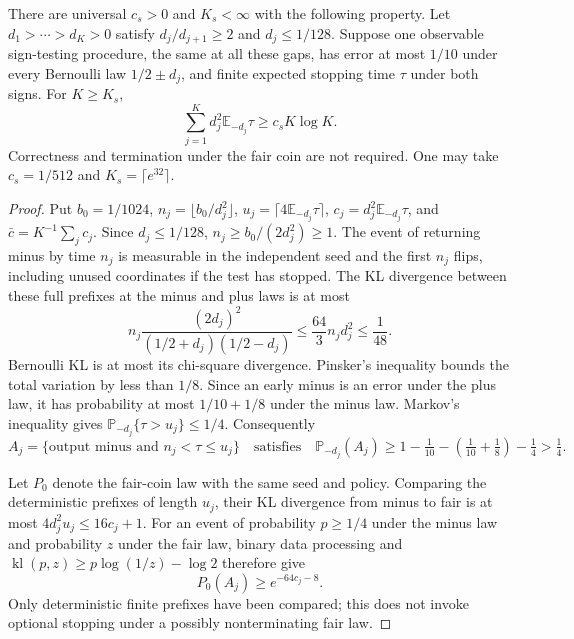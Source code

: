 \begin{lemma}\label{crit:lem:finite-sign-entropy}
There are universal $c_s>0$ and $K_s<\infty$ with the following property.
Let $d_1>\cdots>d_K>0$ satisfy $d_j/d_{j+1}\ge2$ and
$d_j\le1/128$. Suppose one observable sign-testing procedure, the same
at all these gaps, has error at most $1/10$ under every Bernoulli law
$1/2\pm d_j$, and finite expected stopping time $\tau$ under both signs.
For $K\ge K_s$,
\[
              \sum_{j=1}^K d_j^2\mathbb E_{-d_j}\tau
                   \ge c_s K\log K.                    \tag{C.BC2}
\]
Correctness and termination under the fair coin are not required.
One may take $c_s=1/512$ and $K_s=\lceil e^{32}\rceil$.
\end{lemma}
\begin{proof}
Put $b_0=1/1024$, $n_j=\lfloor b_0/d_j^2\rfloor$,
$u_j=\lceil4\mathbb E_{-d_j}\tau\rceil$,
$c_j=d_j^2\mathbb E_{-d_j}\tau$, and
$\bar c=K^{-1}\sum_jc_j$. Since $d_j\le1/128$,
$n_j\ge b_0/(2d_j^2)\ge1$. The event of returning minus by time $n_j$
is measurable in the independent seed and the first $n_j$ flips, including
unused coordinates if the test has stopped. The KL divergence between
these full prefixes at the minus and plus laws is at most
\[
 n_j\frac{(2d_j)^2}{(1/2+d_j)(1/2-d_j)}
 \le\frac{64}{3}n_jd_j^2\le\frac1{48}.
\]
Bernoulli KL is at most its chi-square divergence. Pinsker's inequality
bounds the total variation by less than $1/8$. Since an early minus is
an error under the plus law, it has probability at most $1/10+1/8$ under
the minus law. Markov's inequality gives
$\mathbb P_{-d_j}\{\tau>u_j\}\le1/4$. Consequently
\[
 A_j=\{\text{output minus and }n_j<\tau\le u_j\}
 \quad\text{satisfies}\quad
 \mathbb P_{-d_j}(A_j)
 \ge1-\tfrac1{10}-(\tfrac1{10}+\tfrac18)-\tfrac14>\tfrac14.
\]

Let $P_0$ denote the fair-coin law with the same seed and policy. Comparing
the deterministic prefixes of length $u_j$, their KL divergence from
minus to fair is at most
$4d_j^2u_j\le16c_j+1$. For an event of probability $p\ge1/4$ under
the minus law and probability $z$ under the fair law, binary data
processing and $\operatorname{kl}(p,z)\ge p\log(1/z)-\log2$ therefore give
\[
                     P_0(A_j)\ge e^{-64c_j-8}.          \tag{C.BC3}
\]
Only deterministic finite prefixes have been compared; this does not
invoke optional stopping under a possibly nonterminating fair law.


\end{proof}
